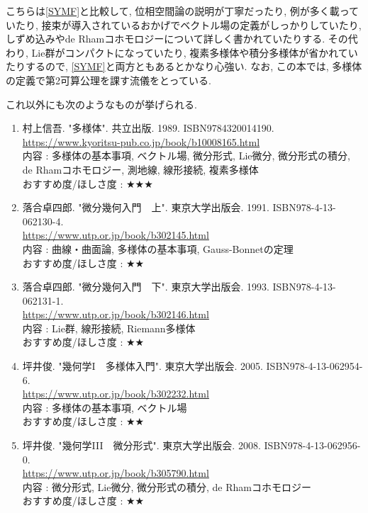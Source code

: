 \documentclass[10pt,a4paper]{jsarticle}
\begin{document}
    こちらは\ref{SYMF}と比較して, 位相空間論の説明が丁寧だったり, 例が多く載っていたり, 接束が導入されているおかげでベクトル場の定義がしっかりしていたり, しずめ込みやde Rhamコホモロジーについて詳しく書かれていたりする. その代わり, Lie群がコンパクトになっていたり, 複素多様体や積分多様体が省かれていたりするので, \ref{SYMF}と両方ともあるとかなり心強い. なお, この本では, 多様体の定義で第2可算公理を課す流儀をとっている. \par
    これ以外にも次のようなものが挙げられる. 
    \begin{enumerate}
        \renewcommand{\theenumi}{[MF\arabic{enumi}]}
        \renewcommand{\labelenumi}{\theenumi}
        \setcounter{enumi}{3}
        \item \label{MSMF} 村上信吾. "多様体". 共立出版. 1989. ISBN9784320014190. \\
        \url{https://www.kyoritsu-pub.co.jp/book/b10008165.html} \\
        内容 : 多様体の基本事項, ベクトル場, 微分形式, Lie微分, 微分形式の積分, de Rhamコホモロジー, 測地線, 線形接続, 複素多様体\\
        おすすめ度/ほしさ度 : $\bigstar \bigstar \bigstar $
        \item \label{OTMF1} 落合卓四郎. "微分幾何入門　上". 東京大学出版会. 1991. ISBN978-4-13-062130-4. \\
        \url{https://www.utp.or.jp/book/b302145.html} \\
        内容 : 曲線・曲面論, 多様体の基本事項, Gauss-Bonnetの定理\\
        おすすめ度/ほしさ度 : $\bigstar \bigstar $
        \item \label{OTMF2} 落合卓四郎. "微分幾何入門　下". 東京大学出版会. 1993. ISBN978-4-13-062131-1. \\
        \url{https://www.utp.or.jp/book/b302146.html} \\
        内容 : Lie群, 線形接続, Riemann多様体\\
        おすすめ度/ほしさ度 : $\bigstar \bigstar $
        \item \label{TTMF1} 坪井俊. "幾何学I　多様体入門". 東京大学出版会. 2005. ISBN978-4-13-062954-6. \\
        \url{https://www.utp.or.jp/book/b302232.html} \\
        内容 : 多様体の基本事項, ベクトル場\\
        おすすめ度/ほしさ度 : $\bigstar \bigstar $
        \item \label{TTMF3} 坪井俊. "幾何学III　微分形式". 東京大学出版会. 2008. ISBN978-4-13-062956-0. \\
        \url{https://www.utp.or.jp/book/b305790.html} \\
        内容 : 微分形式, Lie微分, 微分形式の積分, de Rhamコホモロジー\\
        おすすめ度/ほしさ度 : $\bigstar \bigstar $
    \end{enumerate}\par
\end{document}
